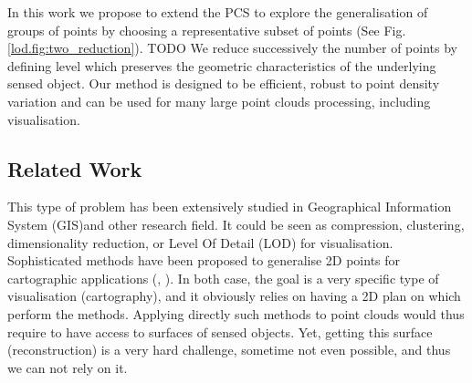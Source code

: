 	
	In this work we propose to extend the PCS to explore the generalisation of groups of points by choosing a representative subset of points (See Fig. \ref{lod.fig:two_reduction}).
	TODO
	We reduce successively the number of points by defining level which preserves the geometric characteristics of the underlying sensed object.
	Our method is designed to be efficient, robust to point density variation and can be used for many large point clouds processing, including visualisation.
	
\subsection{Related Work} 

		
	This type of problem has been extensively studied in Geographical Information System (GIS)and other research field.
	It could be seen as compression, clustering, dimensionality reduction, or Level Of Detail (LOD) for visualisation.
	Sophisticated methods have been proposed to generalise 2D points for cartographic applications (\cite{Sester2001}, \cite{Schwartges2013}).
	In both case, the goal is a very specific type of visualisation (cartography), and it obviously relies on having a 2D plan on which perform the methods.
	Applying directly such methods to point clouds would thus require to have access to surfaces of sensed objects.
	Yet, getting this surface (reconstruction) is a very hard challenge, sometime not even possible, and thus we can not rely on it.
	
